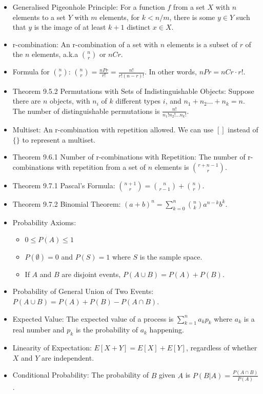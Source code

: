 \documentclass[10pt, portrait]{article}
\begin{document}
\begin{multicols*}{2}
\begin{itemize}
    \item Generalised Pigeonhole Principle: For a function $f$ from a set $X$ with $n$ elements to a set $Y$ with $m$ elements, for $k < n/m$, there is some $y \in Y$ such that $y$ is the image of at least $k+1$ distinct $x \in X$.
    \item r-combination: An r-combination of a set with $n$ elements is a subset of $r$ of the $n$ elements, a.k.a $n \choose r$ or $nCr$.
    \item Formula for $n \choose r$: ${n \choose r} = \frac{nPr}{r!} = \frac{n!}{r!(n-r)!}$. In other words, $nPr = nCr \cdot r!$.
    \item Theorem 9.5.2 Permutations with Sets of Indistinguishable Objects: Suppose there are $n$ objects, with $n_i$ of $k$ different types $i$, and $n_1+n_2...+n_k =n$. The number of distinguishable permutations is $\frac{n!}{n_1!n_2!...n_k!}$.
    \item Multiset: An r-combination with repetition allowed. We can use $[]$ instead of $\{\}$ to represent a multiset.
    \item Theorem 9.6.1 Number of r-combinations with Repetition: The number of r-combinations with repetition from a set of $n$ elements is $r+n-1 \choose r$.
    \item Theorem 9.7.1 Pascal's Formula: ${n+1 \choose r} = {n \choose r-1}+{n \choose r}$.
    \item Theorem 9.7.2 Binomial Theorem: $(a+b)^n=\sum_{k=0}^{n}{n \choose k}a^{n-k}b^k$.
    \item Probability Axioms:
    \begin{itemize}
        \item $0 \leq P(A) \leq 1$
        \item $P(\emptyset)=0$ and $P(S)=1$ where $S$ is the sample space.
        \item If $A$ and $B$ are disjoint events, $P(A \cup B) = P(A)+P(B)$.
    \end{itemize}
    \item Probability of General Union of Two Events: $P(A \cup B)=P(A)+P(B)-P(A \cap B)$.
    \item Expected Value: The expected value of a process is $\sum_{k=1}^na_kp_k$ where $a_k$ is a real number and $p_k$ is the probability of $a_k$ happening.
    \item Linearity of Expectation: $E[X+Y] = E[X]+E[Y]$, regardless of whether $X$ and $Y$ are independent.
    \item Conditional Probability: The probability of $B$ given $A$ is $P(B|A)=\frac{P(A \cap B)}{P(A)}$.

\end{itemize}
\end{multicols*}
\end{document}
